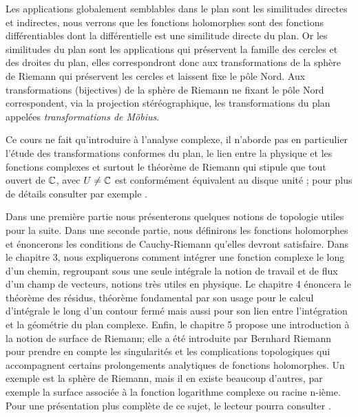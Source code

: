 Les applications globalement semblables dans le plan sont les similitudes directes et indirectes, nous verrons que les fonctions holomorphes sont des fonctions différentiables dont la différentielle est une similitude directe du plan. Or les similitudes du plan sont les applications qui préservent la famille des cercles et des droites du plan, elles correspondront donc aux transformations de la sphère de Riemann qui préservent les cercles et laissent fixe le pôle Nord. Aux transformations (bijectives) de la sphère de Riemann ne fixant le pôle Nord correspondent, via la projection stéréographique, les transformations du plan appelées \emph{transformations de Möbius}.

\vspace{0.1in} 

Ce cours ne fait qu'introduire à l'analyse complexe, il n'aborde pas en particulier l'étude des transformations conformes du plan, le lien entre la physique et les fonctions complexes et surtout le théorème de Riemann qui stipule que tout ouvert de $\mathbb{C}$, avec $U \neq \mathbb{C}$ est conformément équivalent au disque unité ; pour plus de détails consulter par exemple \cite{nehari2012conformal}. 

\vspace{0.1in} 

Dans une première partie nous présenterons quelques notions de topologie utiles pour la suite. Dans une seconde partie, nous définirons les fonctions holomorphes et énoncerons les conditions de Cauchy-Riemann qu'elles devront satisfaire. Dans le chapitre 3, nous expliquerons comment intégrer une fonction complexe le long d'un chemin, regroupant sous une seule intégrale la notion de travail et de flux d'un champ de vecteurs, notions très utiles en physique. Le chapitre 4 énoncera le théorème des résidus, théorème fondamental par son usage pour le calcul d'intégrale le long d'un contour fermé mais aussi pour son lien entre l'intégration et la géométrie du plan complexe. Enfin, le chapitre 5 propose une introduction à la notion de surface de Riemann; elle a été introduite par Bernhard Riemann pour prendre en compte les singularités et les complications topologiques qui accompagnent certains prolongements analytiques de fonctions holomorphes. Un exemple est la sphère de Riemann, mais il en existe beaucoup d'autres, par exemple la surface associée à la fonction logarithme complexe ou racine n-ième. Pour une présentation plus complète de ce sujet, le lecteur pourra consulter \cite{de2010uniformisation}.





